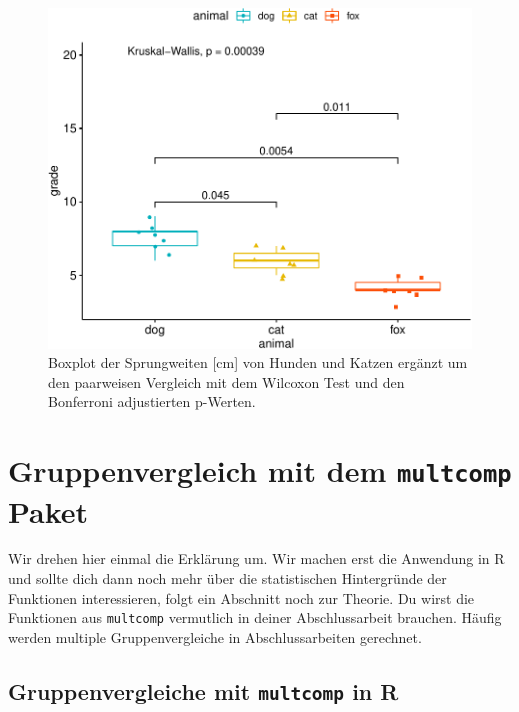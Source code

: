\documentclass[
  letterpaper,
]{scrbook}
\begin{document}
\begin{figure}[H]

{\centering \includegraphics{./stat-tests-posthoc_files/figure-pdf/fig-ggpubr-2-1.pdf}

}

\caption{\label{fig-ggpubr-2}Boxplot der Sprungweiten {[}cm{]} von
Hunden und Katzen ergänzt um den paarweisen Vergleich mit dem Wilcoxon
Test und den Bonferroni adjustierten p-Werten.}

\end{figure}

\hypertarget{sec-posthoc-multcomp}{%
\section{\texorpdfstring{Gruppenvergleich mit dem \texttt{multcomp}
Paket}{Gruppenvergleich mit dem multcomp Paket}}\label{sec-posthoc-multcomp}}

Wir drehen hier einmal die Erklärung um. Wir machen erst die Anwendung
in R und sollte dich dann noch mehr über die statistischen Hintergründe
der Funktionen interessieren, folgt ein Abschnitt noch zur Theorie. Du
wirst die Funktionen aus \texttt{multcomp} vermutlich in deiner
Abschlussarbeit brauchen. Häufig werden multiple Gruppenvergleiche in
Abschlussarbeiten gerechnet.

\hypertarget{gruppenvergleiche-mit-multcomp-in-r}{%
\subsection{\texorpdfstring{Gruppenvergleiche mit \texttt{multcomp} in
R}{Gruppenvergleiche mit multcomp in R}}\label{gruppenvergleiche-mit-multcomp-in-r}}
\end{document}
